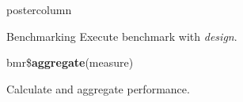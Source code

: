 \documentclass{beamer}
\begin{document}
\begin{frame}[fragile]{}
\begin{columns}
\begin{column}{.245\textwidth}
\begin{beamercolorbox}[center]{postercolumn}
\begin{minipage}{.98\textwidth}
{\begin{myblock}{Benchmarking}
						\hspace*{1ex}Execute benchmark with \textit{design}.
						\\
						\begin{codebox}
							bmr\$\textbf{aggregate}(measure)
						\end{codebox}
						\hspace*{1ex}Calculate and aggregate performance.
					\end{myblock}\vfill
				}
			\end{minipage}
		\end{beamercolorbox}
	\end{column}
\end{columns}
\end{frame}
\end{document}
